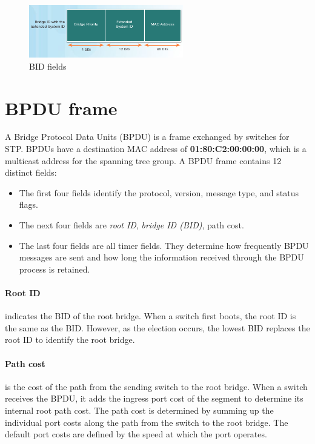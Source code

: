 \begin{figure}[hbtp]
\centering
\includegraphics[width=0.6\textwidth]{pictures/BID.png}
\caption{BID fields}
\label{BID}
\end{figure}



\section{BPDU frame}

A Bridge Protocol Data Units (BPDU) is a frame exchanged by switches for STP. BPDUs have a destination MAC address of \textbf{01:80:C2:00:00:00}, which is a multicast address for the spanning tree group. A BPDU frame contains 12 distinct fields:

\begin{itemize}
\item The first four fields identify the protocol, version, message type, and status flags.
\item The next four fields are \textit{root ID}, \textit{bridge ID (BID)}, path cost.
\item The last four fields are all timer fields. They determine how frequently BPDU messages are sent and how long the information received through the BPDU process is retained.
\end{itemize}

\paragraph{Root ID} indicates the BID of the root bridge. When a switch first boots, the root ID is the same as the BID. However, as the election occurs, the lowest BID replaces the root ID to identify the root bridge.

\paragraph{Path cost}is the cost of the path from the sending switch to the root bridge. When a switch receives the BPDU, it adds the ingress port cost of the segment to determine its internal root path cost. The path cost is determined by summing up the individual port costs along the path from the switch to the root bridge. The default port costs are defined by the speed at which the port operates.

